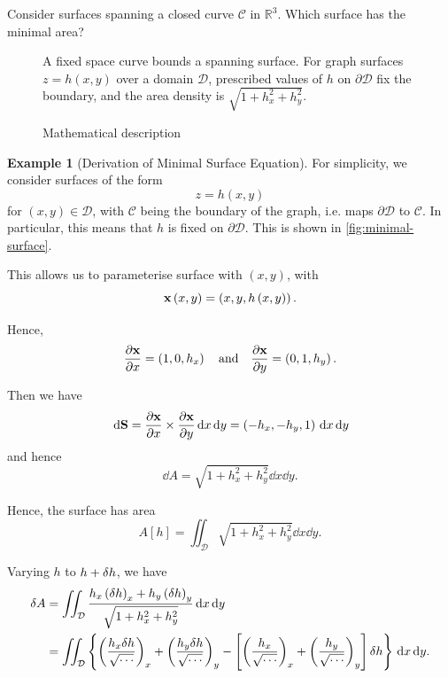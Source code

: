 \documentclass[11pt]{article}
\numberwithin{equation}{section}
\theoremstyle{definition}
\newtheorem{example}[theorem]{Example}
\theoremstyle{remark}
\newcommand{\pqty}[1]{\left(#1\right)}
\newcommand{\bqty}[1]{\left[#1\right]}
\newcommand{\Bqty}[1]{\left\{#1\right\}}
\newcommand{\RR}{\mathbb{R}}
\newcommand{\cross}{\times}
\newcommand{\qand}{\quad\text{and}\quad}
\begin{document}
Consider surfaces spanning a closed curve \(\mathcal{C}\) in \(\RR^3\). Which surface has the minimal area?

\begin{figure}[ht!]\centering\begin{minipage}{.94\linewidth}A fixed space curve bounds a spanning surface. For graph surfaces \(z=h(x,y)\) over a domain \(\mathcal D\), prescribed values of \(h\) on \(\partial\mathcal D\) fix the boundary, and the area density is \(\sqrt{1+h_x^2+h_y^2}\).\end{minipage}\caption{Mathematical description}\label{fig:minimal-surface}\end{figure}

\begin{example}[Derivation of Minimal Surface Equation]\label{variation-unit-0085}
    For simplicity, we consider surfaces of the form
    \[
        z = h \pqty{x, y}
    \]
    for \(\pqty{x, y} \in \mathcal{D}\), with \(\mathcal{C}\) being the boundary of the graph, i.e. maps \(\partial \mathcal{D}\) to \(\mathcal{C}\). In particular, this means that \(h\) is fixed on \(\partial \mathcal{D}\). This is shown in \autoref{fig:minimal-surface}.

    This allows us to parameterise surface with \(\pqty{x, y}\), with
    \[
        \vb{x} \pqty{x, y} = \pqty{x, y, h\pqty{x, y}}.
    \]

    Hence,
    \[
        \pdv{\vb{x}}{x} = \pqty{1, 0, h_x} \qand \pdv{\vb{x}}{y} = \pqty{0, 1, h_y}.
    \]

    Then we have
    \[
        \dd{\vb{S}} = \pdv{\vb{x}}{x} \cross \pdv{\vb{x}}{y} \dd{x} \dd{y} = \pqty{-h_x, -h_y, 1} \dd{x} \dd{y}
    \]
    and hence
    \[
        \dd{A} = \sqrt{1 + h_x^2 + h_y^2} \dd{x} \dd{y}.
    \]

    Hence, the surface has area
    \begin{equation}
        \label{eq:area-functional}%
        A \bqty{h} = \iint_{\mathcal{D}} \sqrt{1 + h_x^2 + h_y^2} \dd{x} \dd{y}.
    \end{equation}

    Varying \(h\) to \(h + \var{h}\), we have
    \begin{align*}
        \var{A} &= \iint_{\mathcal{D}} \frac{h_x \pqty{\delta h}_x + h_y \pqty{\delta h}_y}{\sqrt{1 + h_x^2 + h_y^2}} \dd{x} \dd{y} \\
        &= \iint_{\mathcal{D}} \Bqty{\pqty{\frac{h_x \var{h}}{\sqrt{\cdots}}}_x + \pqty{\frac{h_y \var{h}}{\sqrt{\cdots}}}_y - \bqty{\pqty{\frac{h_x}{\sqrt{\cdots}}}_x + \pqty{\frac{h_y}{\sqrt{\cdots}}}_y} \var{h}} \dd{x} \dd{y}.
    \end{align*}
    

\end{example}
\end{document}
